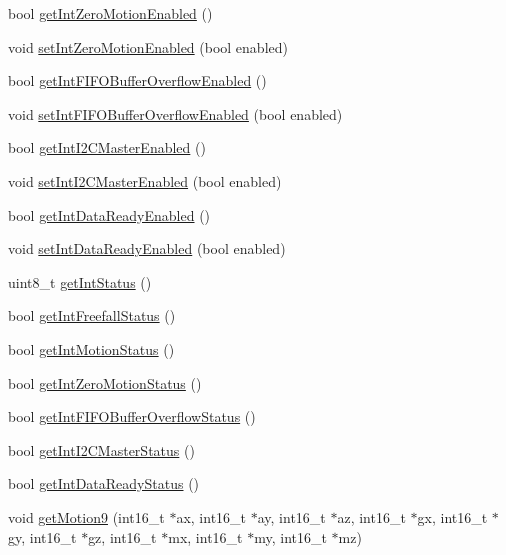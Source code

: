 \begin{DoxyCompactItemize}
\item 
bool \mbox{\hyperlink{classMPU6050_ab3cc9bcaca6cec61e7f3f0c6c8a37db5}{get\+Int\+Zero\+Motion\+Enabled}} ()
\item 
void \mbox{\hyperlink{classMPU6050_a5e36e3acace6e545718d7997169cff9b}{set\+Int\+Zero\+Motion\+Enabled}} (bool enabled)
\item 
bool \mbox{\hyperlink{classMPU6050_a55f99c88cc84901f245924ed5e3fe47e}{get\+Int\+F\+I\+F\+O\+Buffer\+Overflow\+Enabled}} ()
\item 
void \mbox{\hyperlink{classMPU6050_a83710a6b1e07f3b385239cc06f275cdb}{set\+Int\+F\+I\+F\+O\+Buffer\+Overflow\+Enabled}} (bool enabled)
\item 
bool \mbox{\hyperlink{classMPU6050_a282ae29e029d88604a59c92bdf9ce252}{get\+Int\+I2\+C\+Master\+Enabled}} ()
\item 
void \mbox{\hyperlink{classMPU6050_af238656844a3727fa96a8d434b55473e}{set\+Int\+I2\+C\+Master\+Enabled}} (bool enabled)
\item 
bool \mbox{\hyperlink{classMPU6050_ae15f6043a74c9c9bf9754824802ce8d3}{get\+Int\+Data\+Ready\+Enabled}} ()
\item 
void \mbox{\hyperlink{classMPU6050_a67a11be7fc7ab6b1186469b94ea33dda}{set\+Int\+Data\+Ready\+Enabled}} (bool enabled)
\item 
uint8\+\_\+t \mbox{\hyperlink{classMPU6050_a550a735623cb1de950c72cd6931ee804}{get\+Int\+Status}} ()
\item 
bool \mbox{\hyperlink{classMPU6050_a06bbc2116235b7cc5e28c877e0576749}{get\+Int\+Freefall\+Status}} ()
\item 
bool \mbox{\hyperlink{classMPU6050_ac0c0836aa0d237cac92d11591efd0d9f}{get\+Int\+Motion\+Status}} ()
\item 
bool \mbox{\hyperlink{classMPU6050_afa73a5ffdc423736ae88702a469ba3a0}{get\+Int\+Zero\+Motion\+Status}} ()
\item 
bool \mbox{\hyperlink{classMPU6050_aa31427588f059c69d93ddb00ba257b12}{get\+Int\+F\+I\+F\+O\+Buffer\+Overflow\+Status}} ()
\item 
bool \mbox{\hyperlink{classMPU6050_a31d6c2b03fc2d6ce82d67d142f316851}{get\+Int\+I2\+C\+Master\+Status}} ()
\item 
bool \mbox{\hyperlink{classMPU6050_ae4f434eb51a15b536e2e8f89a776872b}{get\+Int\+Data\+Ready\+Status}} ()
\item 
void \mbox{\hyperlink{classMPU6050_aabfd2920e748016383e8124a4b32ad31}{get\+Motion9}} (int16\+\_\+t $\ast$ax, int16\+\_\+t $\ast$ay, int16\+\_\+t $\ast$az, int16\+\_\+t $\ast$gx, int16\+\_\+t $\ast$gy, int16\+\_\+t $\ast$gz, int16\+\_\+t $\ast$mx, int16\+\_\+t $\ast$my, int16\+\_\+t $\ast$mz)

\end{DoxyCompactItemize}
